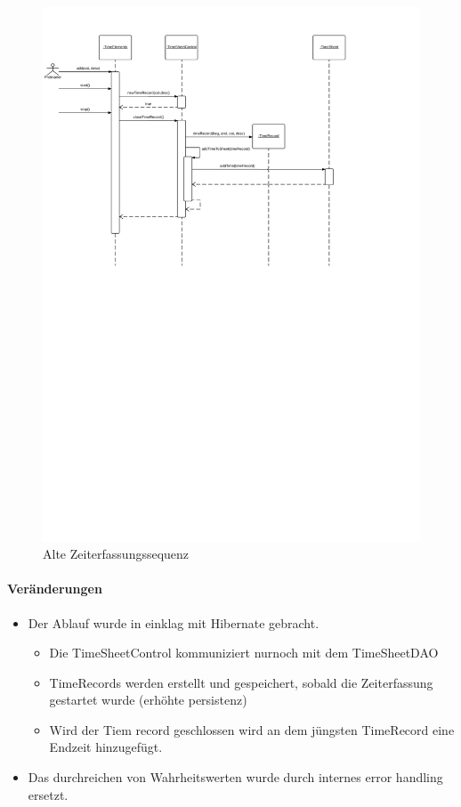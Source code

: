     \begin{figure}[H]
      \centering
        \includegraphics[scale=0.1]{new-Time-record.pdf}
       \caption{Alte Zeiterfassungssequenz}
    \end{figure}

    \paragraph{Veränderungen}
    \begin{itemize}
        \item Der Ablauf wurde in einklag mit Hibernate gebracht.
        \begin{itemize}
            \item Die TimeSheetControl kommuniziert nurnoch mit dem TimeSheetDAO
            \item TimeRecords werden erstellt und gespeichert, sobald die Zeiterfassung gestartet wurde (erhöhte persistenz)
            \item Wird der Tiem record geschlossen wird an dem jüngsten TimeRecord eine Endzeit hinzugefügt.
        \end{itemize}
        \item Das durchreichen von Wahrheitswerten wurde durch internes error handling ersetzt.
    \end{itemize}

